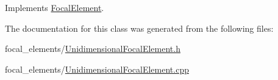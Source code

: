 Implements \hyperlink{classFocalElement_aed131a65fdfc885019f9bf8f1d454508}{Focal\+Element}.



The documentation for this class was generated from the following files\+:\begin{DoxyCompactItemize}
\item 
focal\+\_\+elements/\hyperlink{UnidimensionalFocalElement_8h}{Unidimensional\+Focal\+Element.\+h}\item 
focal\+\_\+elements/\hyperlink{UnidimensionalFocalElement_8cpp}{Unidimensional\+Focal\+Element.\+cpp}\end{DoxyCompactItemize}
